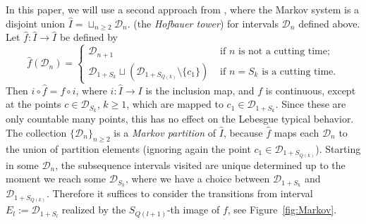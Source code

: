 \documentclass[12pt, psamsfonts, reqno]{amsart}
\begin{document}
In this paper, we will use a second approach from \cite{Bruin, BKS},
where the Markov system is a disjoint union
 $\hat I = \sqcup_{n \geq 2} {{\mathcal D}}_n$.
(the {\em Hofbauer tower}) for intervals ${{\mathcal D}}_n$ defined above.
Let $\hat f : \hat I \to \hat I$ be defined by
$$
\hat f({{\mathcal D}}_n) = \left\{ \begin{array}{ll}
{{\mathcal D}}_{n+1} & \text{ if $n$ is not a cutting time;} \\[1mm]
{{\mathcal D}}_{1+S_k} \sqcup ( {{\mathcal D}}_{1+S_{Q(k)}} \setminus \{c_1\}) & \text{ if $n = S_k$ is a cutting time.}
\end{array} \right.
$$
Then $i \circ \hat f = f \circ i$, where $i : \hat I \to I$ is
the inclusion map, and $f$ is continuous, except at the points
$c \in {{\mathcal D}}_{S_k}$, $k \geq 1$, which are mapped to $c_1 \in {{\mathcal D}}_{1+S_k}$.
Since these are only countable many points, this has no effect on the
Lebesgue typical behavior.
The collection $\{ {{\mathcal D}}_n \}_{n \geq 2}$ is a {\em Markov partition}
of $\hat I$, because $\hat f$ maps each ${{\mathcal D}}_n$ to the union of partition elements
(ignoring again the point $c_1 \in {{\mathcal D}}_{1+S_{Q(k)}}$).
Starting in some ${{\mathcal D}}_n$, the subsequence intervals visited are unique
determined up to the moment we reach some ${{\mathcal D}}_{S_k}$, where we have a choice
between ${{\mathcal D}}_{1+S_k}$ and ${{\mathcal D}}_{1+S_{Q(k)}}$.
Therefore it suffices to consider the transitions from interval
$E_l := {{\mathcal D}}_{1+S_l}$ realized by the $S_{Q(l+1)}$-th image of $f$,
see Figure~\ref{fig:Markov}.
\end{document}
